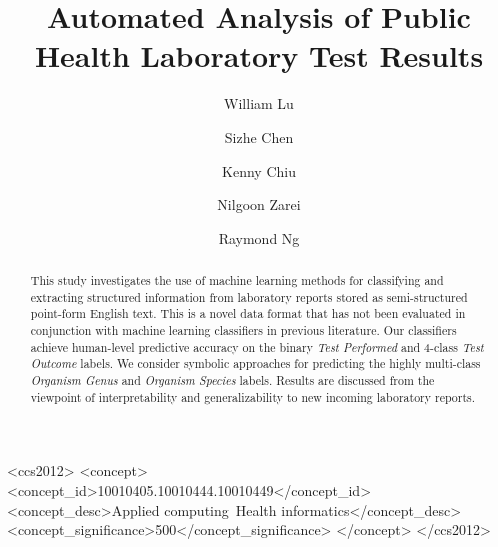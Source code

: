\documentclass[sigconf]{acmart}
\begin{document}
\title{Automated Analysis of Public Health Laboratory Test Results}

\author{William Lu}

\author{Sizhe Chen}

\author{Kenny Chiu}

\author{Nilgoon Zarei}

\author{Raymond Ng}

\renewcommand{\shortauthors}{Lu, Chen, Chiu, Zarei, and Ng}

\begin{abstract}
This study investigates the use of machine learning methods for classifying and extracting structured information from laboratory reports stored as semi-structured point-form English text. This is a novel data format that has not been evaluated in conjunction with machine learning classifiers in previous literature. Our classifiers achieve human-level predictive accuracy on the binary \textit{Test Performed} and 4-class \textit{Test Outcome} labels. We consider symbolic approaches for predicting the highly multi-class \textit{Organism Genus} and \textit{Organism Species} labels. Results are discussed from the viewpoint of interpretability and generalizability to new incoming laboratory reports.
\end{abstract}

\begin{CCSXML}
<ccs2012>
<concept>
<concept_id>10010405.10010444.10010449</concept_id>
<concept_desc>Applied computing~Health informatics</concept_desc>
<concept_significance>500</concept_significance>
</concept>
</ccs2012>
\end{CCSXML}

\end{document}
